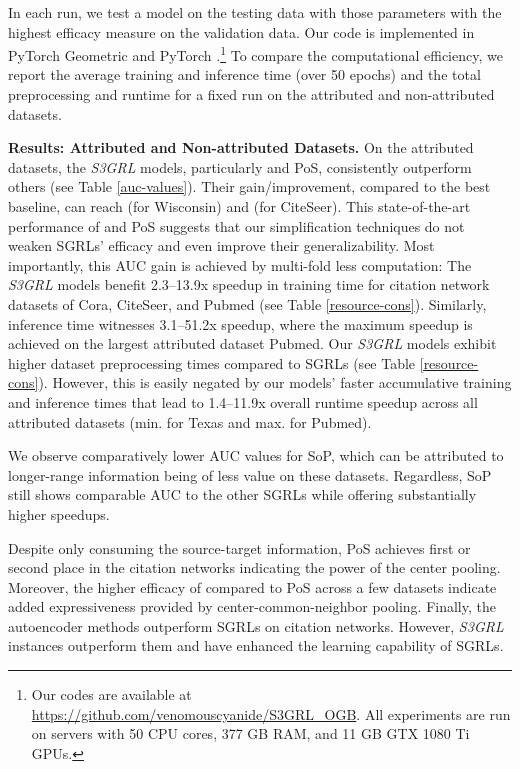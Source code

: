 \documentclass[sigconf, nonacm]{acmart}
\newcommand{\posplus}{\xspace}
\newcommand{\pos}{{P\lowercase{o}S}\xspace}
\newcommand{\sop}{{S\lowercase{o}P}\xspace}
\newcommand{\ssgrl}{\textit{S3GRL}\xspace}
\newcommand{\grA}[1]{#1\textsf{x}}
\begin{document}
In each run, we test a model on the testing data with those parameters with the highest efficacy measure on the validation data. Our code is implemented in PyTorch Geometric \cite{Fey/Lenssen/2019} and PyTorch \cite{paszke2019pytorch}.\footnote{Our codes are available at \href{https://github.com/venomouscyanide/S3GRL\_OGB}{https://github.com/venomouscyanide/S3GRL\_OGB}. All experiments are run on servers with 50 CPU cores, 377 GB RAM, and 11 GB GTX 1080 Ti GPUs.} To compare the computational efficiency, we report the average training and inference time (over 50 epochs) and the total preprocessing and runtime for a fixed run on the attributed and non-attributed datasets. 












\vskip 1mm
\noindent \textbf{Results: Attributed and Non-attributed Datasets.} On the attributed datasets, the \ssgrl models, particularly \posplus and \pos, consistently outperform others (see Table \ref{auc-values}). Their gain/improvement, compared to the best baseline, can reach  (for Wisconsin) and  (for CiteSeer). This state-of-the-art performance of \posplus and \pos suggests that our simplification techniques do not weaken SGRLs' efficacy and even improve their generalizability. Most importantly, this AUC gain is achieved by multi-fold less computation: The \ssgrl models benefit \grA{2.3--13.9} speedup in training time for citation network datasets of Cora, CiteSeer, and Pubmed (see Table \ref{resource-cons}). Similarly, inference time witnesses \grA{3.1--51.2} speedup, where the maximum speedup is achieved on the largest attributed dataset Pubmed. Our \ssgrl models exhibit higher dataset preprocessing times compared to SGRLs (see Table \ref{resource-cons}). However, this is easily negated by our models' faster accumulative training and inference times that lead to  \grA{1.4--11.9} overall runtime speedup across all attributed datasets (min. for Texas and max. for Pubmed). 

We observe comparatively lower AUC values for \sop, which can be attributed to longer-range information being of less value on these datasets. Regardless, \sop still shows comparable AUC to the other SGRLs while offering substantially higher speedups. 

Despite only consuming the source-target information, \pos achieves first or second place in the citation networks indicating the power of the center pooling. Moreover, the higher efficacy of \posplus compared to \pos across a few datasets indicate added expressiveness provided by center-common-neighbor pooling. Finally, the autoencoder methods outperform SGRLs on citation networks. However, \ssgrl instances outperform them and have enhanced the learning capability of SGRLs.
\end{document}
